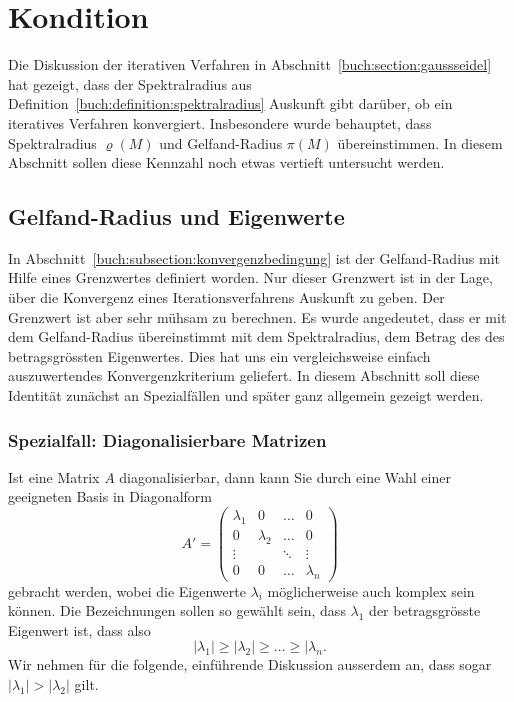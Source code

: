 %
%
%
\section{Kondition
\label{buch:section:kondition}}
Die Diskussion der iterativen Verfahren in
Abschnitt~\ref{buch:section:gaussseidel} hat gezeigt, dass
der Spektralradius aus Definition~\ref{buch:definition:spektralradius}
Auskunft gibt darüber, ob ein iteratives Verfahren konvergiert.
Insbesondere wurde behauptet, dass Spektralradius $\varrho(M)$ und
Gelfand-Radius $\pi(M)$ übereinstimmen.
In diesem Abschnitt sollen diese Kennzahl noch etwas vertieft
untersucht werden.

\subsection{Gelfand-Radius und Eigenwerte
\label{buch:subsection:spektralradius}}
In Abschnitt~\ref{buch:subsection:konvergenzbedingung}
ist der Gelfand-Radius mit Hilfe eines Grenzwertes definiert worden.
Nur dieser Grenzwert ist in der Lage, über die Konvergenz eines 
Iterationsverfahrens Auskunft zu geben.
Der Grenzwert ist aber sehr mühsam zu berechnen.
Es wurde angedeutet, dass er mit dem Gelfand-Radius übereinstimmt
mit dem Spektralradius, dem Betrag des des betragsgrössten Eigenwertes.
Dies hat uns ein vergleichsweise einfach auszuwertendes Konvergenzkriterium
geliefert.
In diesem Abschnitt soll diese Identität zunächst an Spezialfällen
und später ganz allgemein gezeigt werden.

\subsubsection{Spezialfall: Diagonalisierbare Matrizen}
Ist eine Matrix $A$ diagonalisierbar, dann kann Sie durch eine Wahl
einer geeigneten Basis in Diagonalform
\[
A'
=
\begin{pmatrix}
\lambda_1&        0&\dots &0\\
0        &\lambda_2&\dots &0\\
\vdots   &         &\ddots&\vdots\\
0        &        0&\dots &\lambda_n
\end{pmatrix}
\]
gebracht werden, wobei die Eigenwerte $\lambda_i$  möglicherweise auch
komplex sein können.
Die Bezeichnungen sollen so gewählt sein, dass $\lambda_1$ der
betragsgrösste Eigenwert ist, dass also
\[
|\lambda_1| \ge |\lambda_2| \ge \dots \ge |\lambda_n.
\]
Wir nehmen für die folgende, einführende Diskussion ausserdem an, dass
sogar $|\lambda_1|>|\lambda_2|$ gilt.

